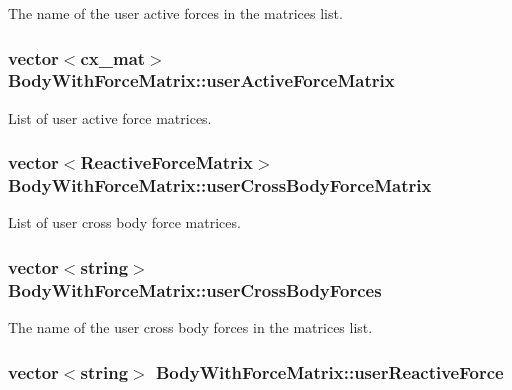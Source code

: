 The name of the user active forces in the matrices list. \hypertarget{class_body_with_force_matrix_aeb11660f006b6e86e8fc691bf55ce346}{
\subsubsection[{user\-Active\-Force\-Matrix}]{\setlength{\rightskip}{0pt plus 5cm}vector$<$cx\-\_\-mat$>$ Body\-With\-Force\-Matrix\-::user\-Active\-Force\-Matrix}}\label{class_body_with_force_matrix_aeb11660f006b6e86e8fc691bf55ce346}
List of user active force matrices. \hypertarget{class_body_with_force_matrix_ad04bf64c3495a2d316f4ede7e6e307d3}{
\subsubsection[{user\-Cross\-Body\-Force\-Matrix}]{\setlength{\rightskip}{0pt plus 5cm}vector$<${\bf Reactive\-Force\-Matrix}$>$ Body\-With\-Force\-Matrix\-::user\-Cross\-Body\-Force\-Matrix}}\label{class_body_with_force_matrix_ad04bf64c3495a2d316f4ede7e6e307d3}
List of user cross body force matrices. \hypertarget{class_body_with_force_matrix_ad97183b090f4f9a1010bcfe028ec55b6}{
\subsubsection[{user\-Cross\-Body\-Forces}]{\setlength{\rightskip}{0pt plus 5cm}vector$<$string$>$ Body\-With\-Force\-Matrix\-::user\-Cross\-Body\-Forces}}\label{class_body_with_force_matrix_ad97183b090f4f9a1010bcfe028ec55b6}
The name of the user cross body forces in the matrices list. \hypertarget{class_body_with_force_matrix_ad334068959cd4ad8591c31ff9d16225f}{
\subsubsection[{user\-Reactive\-Force}]{\setlength{\rightskip}{0pt plus 5cm}vector$<$string$>$ Body\-With\-Force\-Matrix\-::user\-Reactive\-Force}}\label{class_body_with_force_matrix_ad334068959cd4ad8591c31ff9d16225f}

